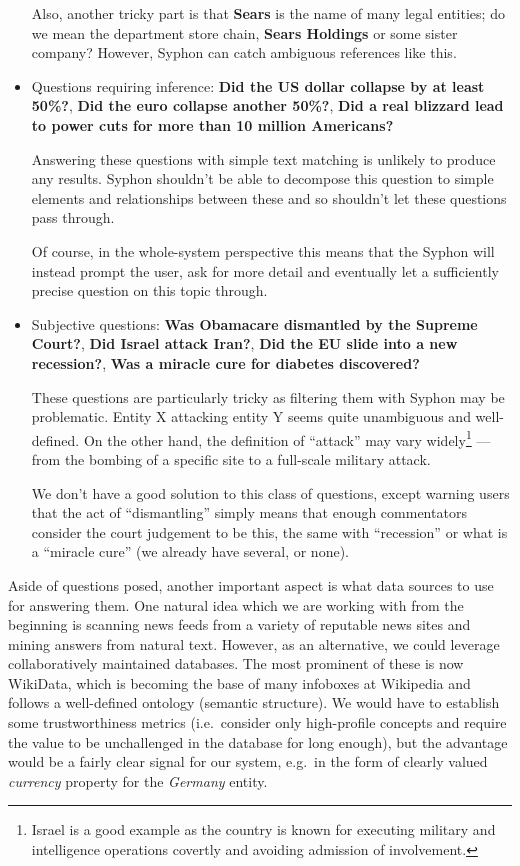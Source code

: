 \documentclass[11pt,a4paper]{article}
\begin{document}
\begin{itemize}
		Also, another tricky part is that \textbf{Sears} is the name
		of many legal entities; do we mean the department store
		chain, \textbf{Sears Holdings} or some sister company?
		However, Syphon can catch ambiguous references like this.

	\item Questions requiring inference: \textbf{Did the US dollar collapse by at least 50\%?},
		\textbf{Did the euro collapse another 50\%?},
		\textbf{Did a real blizzard lead to power cuts for more than 10 million Americans?}

		Answering these questions with simple text matching
		is unlikely to produce any results.  Syphon shouldn't
		be able to decompose this question to simple elements
		and relationships between these and so shouldn't let
		these questions pass through.

		Of course, in the whole-system perspective this means
		that the Syphon will instead
		prompt the user, ask for more detail and
		eventually let a sufficiently precise question on this topic through.

	\item Subjective questions: \textbf{Was Obamacare dismantled by the Supreme Court?},
		\textbf{Did Israel attack Iran?},
		\textbf{Did the EU slide into a new recession?},
		\textbf{Was a miracle cure for diabetes discovered?}

		These questions are particularly tricky as filtering
		them with Syphon may be problematic.  Entity X attacking
		entity Y seems quite unambiguous and well-defined.
		On the other hand, the definition of ``attack'' may
		vary widely\footnote{Israel is a good example as the country is known for executing military and intelligence operations covertly and avoiding admission of involvement.} --- from the bombing of a specific site
		to a full-scale military attack.

		We don't have a good solution to this class of questions,
		except warning users that the act of ``dismantling''
		simply means that enough commentators consider the court
		judgement to be this, the same with ``recession'' or what
		is a ``miracle cure'' (we already have several, or none).
\end{itemize}

Aside of questions posed, another important aspect is what data sources
to use for answering them.  One natural idea which we are working
with from the beginning is scanning news feeds from a variety of reputable
news sites and mining answers from natural text.
However, as an alternative, we could leverage collaboratively maintained
databases.  The most prominent of these is now WikiData, which is becoming the
base of many infoboxes at Wikipedia and follows a well-defined ontology (semantic structure).
We would have to establish some trustworthiness metrics (i.e.\ consider
only high-profile concepts and require the value to be unchallenged in
the database for long enough), but the advantage would be a fairly clear
signal for our system, e.g.\ in the form of clearly valued \textit{currency}
property for the \textit{Germany} entity.
\end{document}

